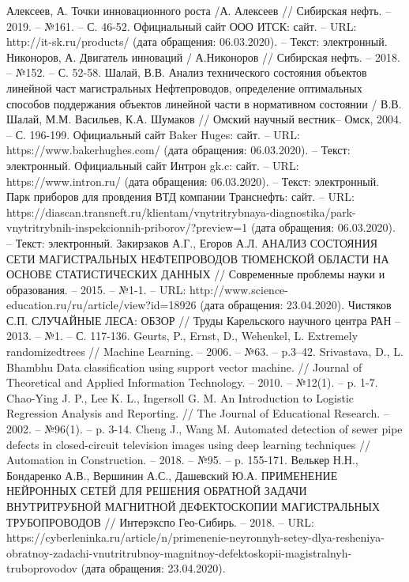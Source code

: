 \documentclass[a4paper,article,14pt]{extarticle}
\begin{document}
\begin{thebibliography}{1}
 Алексеев, А. Точки инновационного роста /А. Алексеев // \flqq Сибирская нефть\frqq. – 2019. – №161. – С. 46-52.
 Официальный сайт ООО \flqq ИТСК\frqq: сайт. – URL: http://it-sk.ru/products/ (дата обращения: 06.03.2020). – Текст: электронный.
 Никоноров, А. Двигатель инноваций / А.Никоноров // \flqq Сибирская нефть\frqq. – 2018. – №152. – С. 52-58.
 Шалай, В.В. Анализ технического состояния объектов линейной част магистральных Нефтепроводов, определение оптимальных способов поддержания объектов линейной части в нормативном состоянии / В.В. Шалай, М.М. Васильев, К.А. Шумаков // \flqq Омский научный вестник\frqq – Омск, 2004. – С. 196-199.
 Официальный сайт \flqq Baker Huges\frqq: сайт. – URL: https://www.bakerhughes.com/ (дата обращения: 06.03.2020). – Текст: электронный.
 Официальный сайт \flqq Интрон gk.c\frqq: сайт. – URL: https://www.intron.ru/ (дата обращения: 06.03.2020). – Текст: электронный.
 Парк приборов для провдения ВТД компании \flqq Транснефть\frqq: сайт. – URL: https://diascan.transneft.ru/klientam/vnytritrybnaya-diagnostika/park-vnytritrybnih-inspekcionnih-priborov/?preview=1 (дата обращения: 06.03.2020). – Текст: электронный.
 Закирзаков А.Г., Егоров А.Л. АНАЛИЗ СОСТОЯНИЯ СЕТИ МАГИСТРАЛЬНЫХ НЕФТЕПРОВОДОВ ТЮМЕНСКОЙ ОБЛАСТИ НА ОСНОВЕ СТАТИСТИЧЕСКИХ ДАННЫХ // Современные проблемы науки и образования. – 2015. – №1-1. – URL: http://www.science-education.ru/ru/article/view?id=18926 (дата обращения: 23.04.2020).
 Чистяков С.П. СЛУЧАЙНЫЕ ЛЕСА: ОБЗОР // Труды Карельского научного центра РАН – 2013. – №1. – С. 117-136.
 Geurts, P., Ernst, D., Wehenkel, L. Extremely randomizedtrees // Machine Learning. – 2006. – №63. –  p.3–42.
 Srivastava, D., L. Bhambhu Data classification  using  support  vector  machine. // Journal of Theoretical and Applied Information Technology. – 2010. – №12(1). – p. 1-7.
 Chao-Ying J. P., Lee K. L., Ingersoll G. M. An Introduction to Logistic Regression Analysis and Reporting. // The Journal of Educational Research. – 2002. – №96(1). – p. 3-14.
 Cheng J., Wang M. Automated detection of sewer pipe defects in closed-circuit television images using deep learning techniques // Automation in Construction. – 2018. – №95. – p. 155-171.
 Велькер Н.Н., Бондаренко А.В., Вершинин А.С., Дашевский Ю.А. ПРИМЕНЕНИЕ НЕЙРОННЫХ СЕТЕЙ ДЛЯ РЕШЕНИЯ ОБРАТНОЙ ЗАДАЧИ ВНУТРИТРУБНОЙ МАГНИТНОЙ ДЕФЕКТОСКОПИИ МАГИСТРАЛЬНЫХ ТРУБОПРОВОДОВ // Интерэкспо Гео-Сибирь. – 2018. – URL: https://cyberleninka.ru/article/n/primenenie-neyronnyh-setey-dlya-resheniya-obratnoy-zadachi-vnutritrubnoy-magnitnoy-defektoskopii-magistralnyh-truboprovodov (дата обращения: 23.04.2020).

\end{thebibliography}
\end{document}
